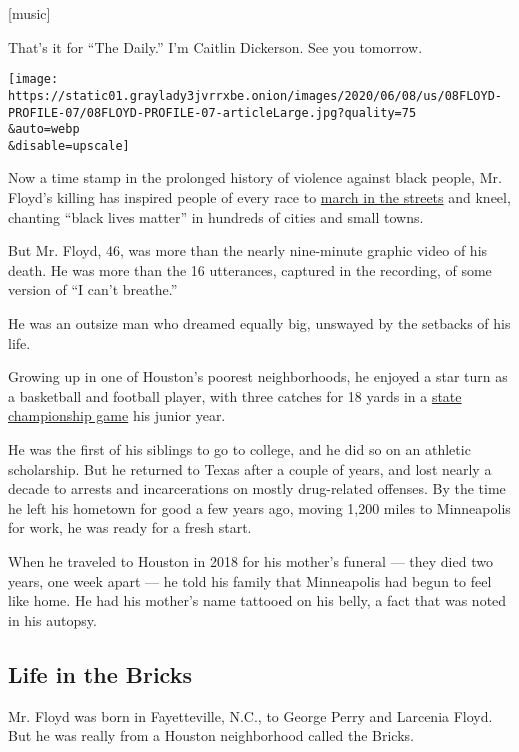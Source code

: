 {[}music{]}

That's it for ``The Daily.'' I'm Caitlin Dickerson. See you tomorrow.

\texttt{[image: https://static01.graylady3jvrrxbe.onion/images/2020/06/08/us/08FLOYD-PROFILE-07/08FLOYD-PROFILE-07-articleLarge.jpg?quality=75\\\&auto=webp\\\&disable=upscale]}

Now a time stamp in the prolonged history of violence against black
people, Mr. Floyd's killing has inspired people of every race to
\href{https://www.nytimes3xbfgragh.onion/2020/06/06/us/george-floyd-memorial-protests.html}{march
in the streets} and kneel, chanting ``black lives matter'' in hundreds
of cities and small towns.

But Mr. Floyd, 46, was more than the nearly nine-minute graphic video of
his death. He was more than the 16 utterances, captured in the
recording, of some version of ``I can't breathe.''

He was an outsize man who dreamed equally big, unswayed by the setbacks
of his life.

Growing up in one of Houston's poorest neighborhoods, he enjoyed a star
turn as a basketball and football player, with three catches for 18
yards in a
\href{https://www.expressnews.com/texas-sports-nation/highschool/article/George-Floyd-death-Yates-High-School-football-15298818.php}{state
championship game} his junior year.

He was the first of his siblings to go to college, and he did so on an
athletic scholarship. But he returned to Texas after a couple of years,
and lost nearly a decade to arrests and incarcerations on mostly
drug-related offenses. By the time he left his hometown for good a few
years ago, moving 1,200 miles to Minneapolis for work, he was ready for
a fresh start.

When he traveled to Houston in 2018 for his mother's funeral --- they
died two years, one week apart --- he told his family that Minneapolis
had begun to feel like home. He had his mother's name tattooed on his
belly, a fact that was noted in his autopsy.

\hypertarget{life-in-the-bricks}{%
\subsection{Life in the Bricks}\label{life-in-the-bricks}}

Mr. Floyd was born in Fayetteville, N.C., to George Perry and Larcenia
Floyd. But he was really from a Houston neighborhood called the Bricks.

